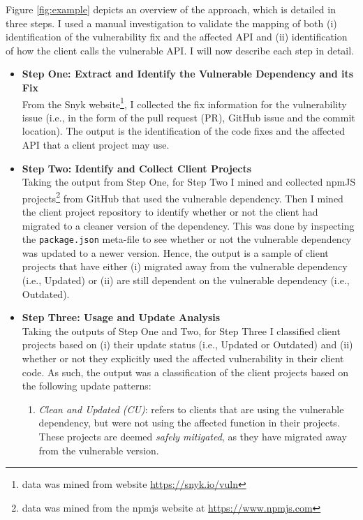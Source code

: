 Figure \ref{fig:example} depicts an overview of the approach, which is detailed in three steps.
I used a manual investigation to validate the mapping of both (i) identification of the vulnerability fix and the affected API and (ii) identification of how the client calls the vulnerable API.
I will now describe each step in detail.
\begin{itemize}
    \item \textbf{Step One: Extract and Identify the Vulnerable Dependency and its Fix} \\
    From the Snyk website\footnote{data was mined from website \url{https://snyk.io/vuln}}, I collected the fix information for the vulnerability issue (i.e., in the form of the pull request (PR), GitHub issue and the commit location). 
    The output is the identification of the code fixes and the affected API that a client project may use.
    
    \item \textbf{Step Two: Identify and Collect Client Projects } \\
    Taking the output from Step One, for Step Two I mined and collected npmJS projects\footnote{data was mined from the npmjs website at \url{https://www.npmjs.com}} from GitHub that used the vulnerable dependency.
    Then I mined the client project repository to identify whether or not the client had migrated to a cleaner version of the dependency.
    This was done by inspecting the \texttt{package.json} meta-file to see whether or not the vulnerable dependency was updated to a newer version.
    Hence, the output is a sample of client projects that have either (i) migrated away from the vulnerable dependency (i.e., Updated) or (ii) are still dependent on the vulnerable dependency (i.e., Outdated). 
    
    \item \textbf{Step Three: Usage and Update Analysis} \\
    Taking the outputs of Step One and Two, for Step Three I classified client projects based on (i) their update status (i.e., Updated or Outdated) and (ii) whether or not they explicitly used the affected vulnerability in their client code.
    As such, the output was a classification of the client projects based on the  following update patterns: 
\begin{enumerate}
    \item \textit{Clean and Updated (CU)}: refers to clients that are using the vulnerable dependency, but were not using the affected function in their projects. These projects are deemed \textit{safely mitigated}, as they have migrated away from the vulnerable version. 
    

\end{enumerate}
\end{itemize}
